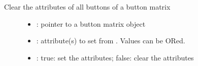 \documentclass[letterpaper,10pt,english]{sphinxmanual}
\begin{document}

\begin{fulllineitems}
\label{\detokenize{object-types/btnm:_CPPv426lv_btnm_clear_btn_ctrl_allP8lv_obj_t14lv_btnm_ctrl_t}}%
\pysigstartmultiline
{}\label{\detokenize{object-types/btnm:lv__btnm_8h_1acaf56d04d312be5f1cac1cf0acd5bc78}}%
\pysigstopmultiline
Clear the attributes of all buttons of a button matrix \begin{description}
\item[{}] \leavevmode\begin{itemize}
\item {} 
: pointer to a button matrix object 

\item {} 
: attribute(s) to set from . Values can be ORed. 

\item {} 
: true: set the attributes; false: clear the attributes 

\end{itemize}

\end{description}


\end{fulllineitems}

\end{document}
